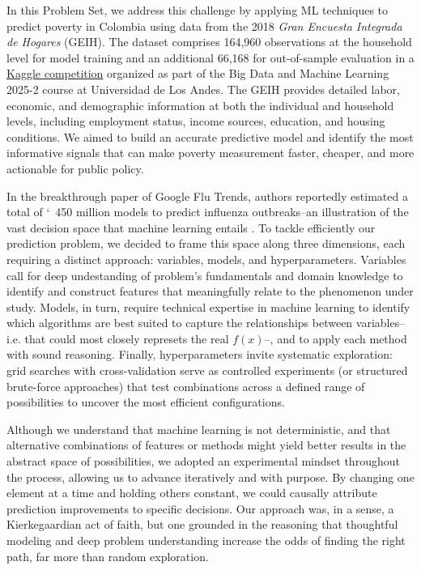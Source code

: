 \documentclass[12pt,a4paper,onecolumn]{article}
\begin{document}
In this Problem Set, we address this challenge by applying ML techniques to predict poverty in Colombia using data from the 2018 \emph{Gran Encuesta Integrada de Hogares} (GEIH)\citep{DANE2025c}. The dataset comprises 164,960 observations at the household level for model training and an additional 66,168 for out-of-sample evaluation in a \href{https://www.kaggle.com/competitions/uniandes-bdml-2025-20-ps-2/overview}{Kaggle competition} organized as part of the Big Data and Machine Learning 2025-2 course at Universidad de Los Andes. The GEIH provides detailed labor, economic, and demographic information at both the individual and household levels, including employment status, income sources, education, and housing conditions. We aimed to build an accurate predictive model and identify the most informative signals that can make poverty measurement faster, cheaper, and more actionable for public policy.

In the breakthrough paper of Google Flu Trends, authors reportedly estimated a total of \char`~450 million models to predict influenza outbreaks--an illustration of the vast decision space that machine learning entails \citep{Google2009}. To tackle efficiently our prediction problem, we decided to frame this space along three dimensions, each requiring a distinct approach: variables, models, and hyperparameters. Variables call for deep undestanding of problem’s fundamentals and domain knowledge to identify and construct features that meaningfully relate to the phenomenon under study. Models, in turn, require technical expertise in machine learning to identify which algorithms are best suited to capture the relationships between variables--i.e. that could most closely represets the real $f(x)$--, and to apply each method with sound reasoning. Finally, hyperparameters invite systematic exploration: grid searches with cross-validation serve as controlled experiments (or structured brute-force approaches) that test combinations across a defined range of possibilities to uncover the most efficient configurations.

Although we understand that machine learning is not deterministic, and that alternative combinations of features or methods might yield better results in the abstract space of possibilities, we adopted an experimental mindset throughout the process, allowing us to advance iteratively and with purpose. By changing one element at a time and holding others constant, we could causally attribute prediction improvements to specific decisions. Our approach was, in a sense, a Kierkegaardian act of faith, but one grounded in the reasoning that thoughtful modeling and deep problem understanding increase the odds of finding the right path, far more than random exploration. 
\end{document}
